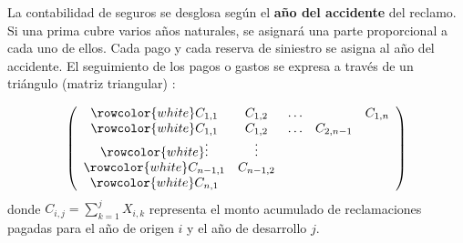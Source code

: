 \begin{f}
	
	La contabilidad de seguros se desglosa según el \textbf{año del accidente} del reclamo. 
	Si una prima cubre varios años naturales, se asignará una parte proporcional a cada uno de ellos.
	Cada pago y cada reserva de siniestro se asigna al año del accidente.
	El seguimiento de los pagos o gastos se expresa a través de un triángulo (matriz triangular) :
	
	\[
	\left(\begin{array}{ccccc}
		\rowcolor{white}	C_{1,1} & C_{1,2} & \ldots & & C_{1, n} \\
		\rowcolor{white}	C_{1,1} & C_{1,2} & \ldots & C_{2, n-1} \\
		\rowcolor{white}	\vdots & \vdots & & \\
		\rowcolor{white}	C_{n-1,1} & C_{n-1,2} & & \\
		\rowcolor{white}	C_{n, 1} & & &
	\end{array}\right)
	\]
	donde \(C_{i, j}=\sum_{k=1}^{j} X_{i, k}\) representa el monto acumulado de reclamaciones pagadas para el año de origen \(i\) y el año de desarrollo \(j\).
	
\end{f}


